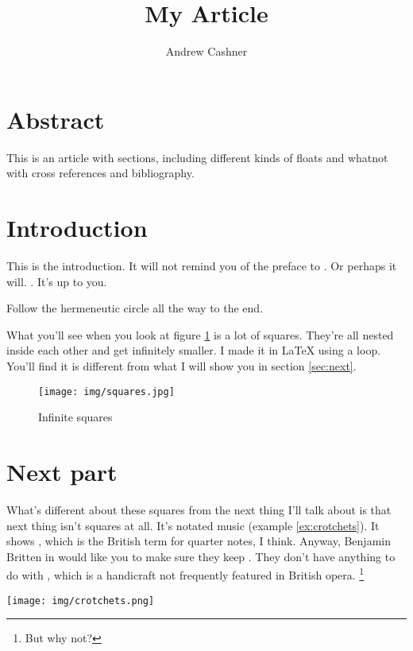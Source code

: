 \documentclass{ms}
\title{My Article}
\author{Andrew Cashner}
\begin{document}
\maketitle
\section*{Abstract}

This is an article with sections, including different kinds of floats and
whatnot with cross references and bibliography.

\section{Introduction}

This is the introduction. It will not remind you of the preface to
. 
Or perhaps it will. 
 \autocite[1]{Kircher:Musurgia}.
It's up to you.%
\begin{Footnote}
    Follow the hermeneutic circle all the way to the end.
\end{Footnote}

What you'll see when you look at figure \ref{fig:squares} is a lot of squares.
They're all nested inside each other and get infinitely smaller.
I made it in LaTeX using a loop. 
You'll find it is different from what I will show you in section \ref{sec:next}.

\begin{figure}
    \label{fig:squares}
    \texttt{[image: img/squares.jpg]}
    \caption{Infinite squares}
\end{figure}

\section{Next part \label{sec:next}}

What's different about these squares from the next thing I'll talk about is
that next thing isn't squares at all. 
It's notated music (example \ref{ex:crotchets}).
It shows , which is the British term for quarter notes, I think. 
Anyway, Benjamin Britten in  would like you to make sure
they keep .
They don't have anything to do with , which is a handicraft
not frequently featured in British opera.%
\footnote{But why not?}

\begin{example}
    \label{ex:crotchets}
    \texttt{[image: img/crotchets.png]}
    \caption{``Gently flowing crotchets''}
\end{example}

\printbibliography
\end{document}
